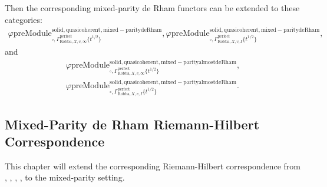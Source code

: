 \documentclass[12pt]{book}
\theoremstyle{definition}
\begin{document}
\indent Then the corresponding mixed-parity de Rham functors can be extended to these categories:
\begin{align}
\varphi\mathrm{preModule}^\mathrm{solid,quasicoherent,mixed-paritydeRham}_{\square,\Gamma^\mathrm{perfect}_{\text{Robba},X,v,\infty}\{t^{1/2}\}},
\varphi\mathrm{preModule}^\mathrm{solid,quasicoherent,mixed-paritydeRham}_{\square,\Gamma^\mathrm{perfect}_{\text{Robba},X,v,I}\{t^{1/2}\}}, 
\end{align}
and
\begin{align}
\varphi\mathrm{preModule}^\mathrm{solid,quasicoherent,mixed-parityalmostdeRham}_{\square,\Gamma^\mathrm{perfect}_{\text{Robba},X,v,\infty}\{t^{1/2}\}},\\
\varphi\mathrm{preModule}^\mathrm{solid,quasicoherent,mixed-parityalmostdeRham}_{\square,\Gamma^\mathrm{perfect}_{\text{Robba},X,v,I}\{t^{1/2}\}}. 
\end{align}



\subsection{Mixed-Parity de Rham Riemann-Hilbert Correspondence}


\indent This chapter will extend the corresponding Riemann-Hilbert correspondence from \cite{Sch1}, \cite{LZ}, \cite{BL1}, \cite{BL2}, \cite{M} to the mixed-parity setting.
\end{document}
